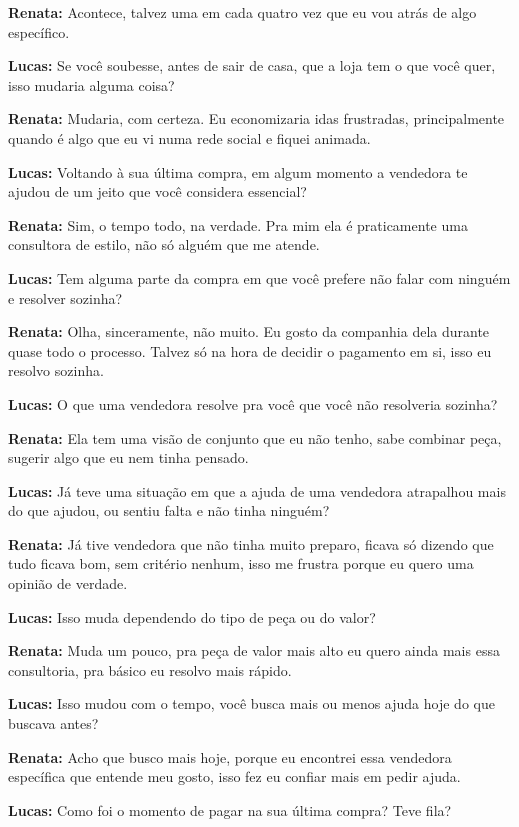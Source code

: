 \textbf{Renata:} Acontece, talvez uma em cada quatro vez que eu vou atrás de algo específico.

\textbf{Lucas:} Se você soubesse, antes de sair de casa, que a loja tem o que você quer, isso mudaria alguma coisa?

\textbf{Renata:} Mudaria, com certeza. Eu economizaria idas frustradas, principalmente quando é algo que eu vi numa rede social e fiquei animada.

\textbf{Lucas:} Voltando à sua última compra, em algum momento a vendedora te ajudou de um jeito que você considera essencial?

\textbf{Renata:} Sim, o tempo todo, na verdade. Pra mim ela é praticamente uma consultora de estilo, não só alguém que me atende.

\textbf{Lucas:} Tem alguma parte da compra em que você prefere não falar com ninguém e resolver sozinha?

\textbf{Renata:} Olha, sinceramente, não muito. Eu gosto da companhia dela durante quase todo o processo. Talvez só na hora de decidir o pagamento em si, isso eu resolvo sozinha.

\textbf{Lucas:} O que uma vendedora resolve pra você que você não resolveria sozinha?

\textbf{Renata:} Ela tem uma visão de conjunto que eu não tenho, sabe combinar peça, sugerir algo que eu nem tinha pensado.

\textbf{Lucas:} Já teve uma situação em que a ajuda de uma vendedora atrapalhou mais do que ajudou, ou sentiu falta e não tinha ninguém?

\textbf{Renata:} Já tive vendedora que não tinha muito preparo, ficava só dizendo que tudo ficava bom, sem critério nenhum, isso me frustra porque eu quero uma opinião de verdade.

\textbf{Lucas:} Isso muda dependendo do tipo de peça ou do valor?

\textbf{Renata:} Muda um pouco, pra peça de valor mais alto eu quero ainda mais essa consultoria, pra básico eu resolvo mais rápido.

\textbf{Lucas:} Isso mudou com o tempo, você busca mais ou menos ajuda hoje do que buscava antes?

\textbf{Renata:} Acho que busco mais hoje, porque eu encontrei essa vendedora específica que entende meu gosto, isso fez eu confiar mais em pedir ajuda.

\textbf{Lucas:} Como foi o momento de pagar na sua última compra? Teve fila?

